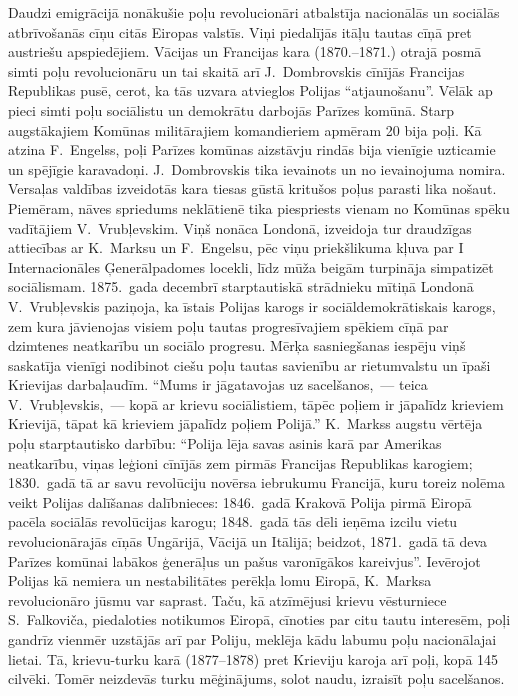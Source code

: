 \documentclass[twoside,a5paper,12pt,fleqn,openany]{extbook}
\begin{document}
Daudzi emigrācijā nonākušie poļu revolucionāri atbalstīja nacionālās un sociālās atbrīvošanās cīņu citās Eiropas valstīs. Viņi piedalījās itāļu tautas cīņā pret austriešu apspiedējiem. Vācijas un Francijas kara (1870.--1871.) otrajā posmā simti poļu revolucionāru un tai skaitā arī J.~Dombrovskis cīnījās Francijas Republikas pusē, cerot, ka tās uzvara atvieglos Polijas ``atjaunošanu''. Vēlāk ap pieci simti poļu sociālistu un demokrātu darbojās Parīzes komūnā. Starp augstākajiem Komūnas militārajiem komandieriem apmēram 20 bija poļi. Kā atzina F.~Engelss, poļi Parīzes komūnas aizstāvju rindās bija vienīgie uzticamie un spējīgie karavadoņi. J.~Dombrovskis tika ievainots un no ievainojuma nomira. Versaļas valdības izveidotās kara tiesas gūstā kritušos poļus parasti lika nošaut. Piemēram, nāves spriedums neklātienē tika piespriests vienam no Komūnas spēku vadītājiem V.~Vrubļevskim. Viņš nonāca Londonā, izveidoja tur draudzīgas attiecības ar K.~Marksu un F.~Engelsu, pēc viņu priekšlikuma kļuva par I Internacionāles Ģenerālpadomes locekli, līdz mūža beigām turpināja simpatizēt sociālismam. 1875.~gada decembrī starptautiskā strādnieku mītiņā Londonā V.~Vrubļevskis paziņoja, ka īstais Polijas karogs ir sociāldemokrātiskais karogs, zem kura jāvienojas visiem poļu tautas progresīvajiem spēkiem cīņā par dzimtenes neatkarību un sociālo progresu. Mērķa sasniegšanas iespēju viņš saskatīja vienīgi nodibinot ciešu poļu tautas savienību ar rietumvalstu un īpaši Krievijas darbaļaudīm. ``Mums ir jāgatavojas uz sacelšanos,~--- teica V.~Vrubļevskis,~--- kopā ar krievu sociālistiem, tāpēc poļiem ir jāpalīdz krieviem Krievijā, tāpat kā krieviem jāpalīdz poļiem Polijā.'' K.~Markss augstu vērtēja poļu starptautisko darbību: ``Polija lēja savas asinis karā par Amerikas neatkarību, viņas leģioni cīnījās zem pirmās Francijas Republikas karogiem; 1830.~gadā tā ar savu revolūciju novērsa iebrukumu Francijā, kuru toreiz nolēma veikt Polijas dalīšanas dalībnieces: 1846.~gadā Krakovā Polija pirmā Eiropā pacēla sociālās revolūcijas karogu; 1848.~gadā tās dēli ieņēma izcilu vietu revolucionārajās cīņās Ungārijā, Vācijā un Itālijā; beidzot, 1871.~gadā tā deva Parīzes komūnai labākos ģenerāļus un pašus varonīgākos kareivjus''. Ievērojot Polijas kā nemiera un nestabilitātes perēkļa lomu Eiropā, K.~Marksa revolucionāro jūsmu var saprast. Taču, kā atzīmējusi krievu vēsturniece S.~Falkoviča, piedaloties notikumos Eiropā, cīnoties par citu tautu interesēm, poļi gandrīz vienmēr uzstājās arī par Poliju, meklēja kādu labumu poļu nacionālajai lietai. Tā, krievu-turku karā (1877--1878) pret Krieviju karoja arī poļi, kopā 145 cilvēki. Tomēr neizdevās turku mēģinājums, solot naudu, izraisīt poļu sacelšanos.
\end{document}
